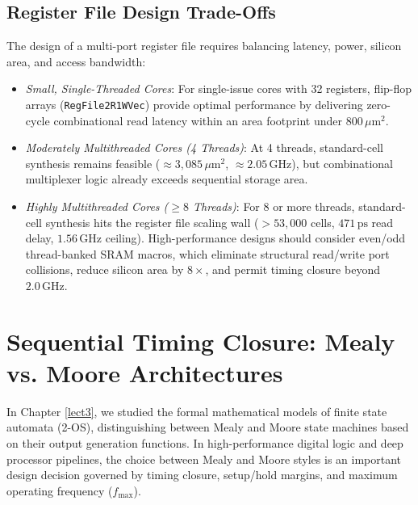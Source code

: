 \subsection{Register File Design Trade-Offs} \label{subsec:regfile_tradeoffs}
The design of a multi-port register file requires balancing latency, power, silicon area, and access bandwidth:
\begin{itemize}
    \item \textit{Small, Single-Threaded Cores}: For single-issue cores with 32 registers, flip-flop arrays (\texttt{RegFile2R1WVec}) provide optimal performance by delivering zero-cycle combinational read latency within an area footprint under $800\,\mu\text{m}^2$.
    
    \item \textit{Moderately Multithreaded Cores (4 Threads)}: At 4 threads, standard-cell synthesis remains feasible ($\approx 3,085\,\mu\text{m}^2$, $\approx 2.05\,\text{GHz}$), but combinational multiplexer logic already exceeds sequential storage area.
    
    \item \textit{Highly Multithreaded Cores ($\ge 8$ Threads)}: For 8 or more threads, standard-cell synthesis hits the register file scaling wall ($>53,000$ cells, $471\,\text{ps}$ read delay, $1.56\,\text{GHz}$ ceiling). High-performance designs should consider even/odd thread-banked SRAM macros, which eliminate structural read/write port collisions, reduce silicon area by $8\times$, and permit  timing closure beyond $2.0\,\text{GHz}$.
\end{itemize}


\section{Sequential Timing Closure: Mealy vs. Moore Architectures} \label{sec:mealy_moore_timing}

In Chapter \ref{lect3}, we studied the formal mathematical models of finite state automata (2-OS), distinguishing between Mealy and Moore state machines based on their output generation functions. In high-performance digital logic and deep processor pipelines, the choice between Mealy and Moore styles is an important design decision governed by timing closure, setup/hold margins, and maximum operating frequency ($f_{\max}$).

